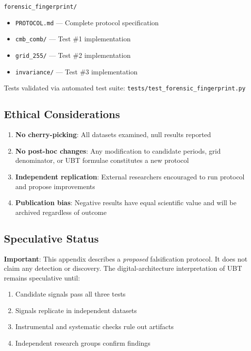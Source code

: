 \texttt{forensic\_fingerprint/}
\begin{itemize}
    \item \texttt{PROTOCOL.md} — Complete protocol specification
    \item \texttt{cmb\_comb/} — Test \#1 implementation
    \item \texttt{grid\_255/} — Test \#2 implementation
    \item \texttt{invariance/} — Test \#3 implementation
\end{itemize}

Tests validated via automated test suite: \texttt{tests/test\_forensic\_fingerprint.py}

\subsection{Ethical Considerations}

\begin{enumerate}
    \item \textbf{No cherry-picking}: All datasets examined, null results reported
    \item \textbf{No post-hoc changes}: Any modification to candidate periods, grid denominator, or UBT formulae constitutes a new protocol
    \item \textbf{Independent replication}: External researchers encouraged to run protocol and propose improvements
    \item \textbf{Publication bias}: Negative results have equal scientific value and will be archived regardless of outcome
\end{enumerate}

\subsection{Speculative Status}

\textbf{Important}: This appendix describes a \textit{proposed} falsification protocol. It does not claim any detection or discovery. The digital-architecture interpretation of UBT remains speculative until:
\begin{enumerate}
    \item Candidate signals pass all three tests
    \item Signals replicate in independent datasets
    \item Instrumental and systematic checks rule out artifacts
    \item Independent research groups confirm findings
\end{enumerate}

